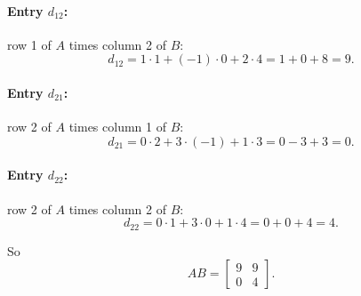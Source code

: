 \documentclass[12pt]{article}
\begin{document}
	\paragraph{Entry $d_{12}$:} row 1 of $A$ times column 2 of $B$:
	\[
	d_{12} = 1\cdot 1 + (-1)\cdot 0 + 2\cdot 4 = 1 + 0 + 8 = 9.
	\]
	
	\paragraph{Entry $d_{21}$:} row 2 of $A$ times column 1 of $B$:
	\[
	d_{21} = 0\cdot 2 + 3\cdot(-1) + 1\cdot 3 = 0 - 3 + 3 = 0.
	\]
	
	\paragraph{Entry $d_{22}$:} row 2 of $A$ times column 2 of $B$:
	\[
	d_{22} = 0\cdot 1 + 3\cdot 0 + 1\cdot 4 = 0 + 0 + 4 = 4.
	\]
	
	So
	\[
	AB =
	\begin{bmatrix}
		9 & 9 \\
		0 & 4
	\end{bmatrix}.
	\]
	
\end{document}
